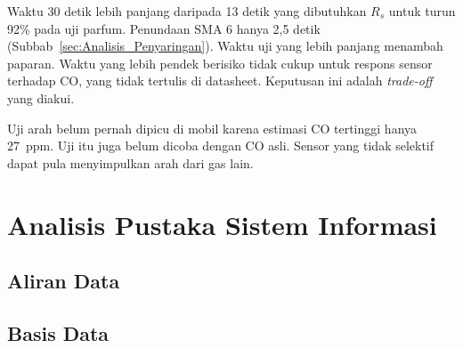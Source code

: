     Waktu 30 detik lebih panjang daripada 13 detik yang dibutuhkan $R_s$ untuk turun 92\% pada uji parfum. Penundaan SMA 6 hanya 2,5 detik (Subbab~\ref{sec:Analisis_Penyaringan}). Waktu uji yang lebih panjang menambah paparan. Waktu yang lebih pendek berisiko tidak cukup untuk respons sensor terhadap CO, yang tidak tertulis di datasheet. Keputusan ini adalah \textit{trade-off} yang diakui.

    Uji arah belum pernah dipicu di mobil karena estimasi CO tertinggi hanya 27~ppm. Uji itu juga belum dicoba dengan CO asli. Sensor yang tidak selektif dapat pula menyimpulkan arah dari gas lain.


\section{Analisis Pustaka Sistem Informasi}
\label{sec:Analisis_Sistem_Informasi}

    \subsection{Aliran Data}
    \label{sec:Aliran_Data}

    \lipsum[1]

    \subsection{Basis Data}
    \label{sec:Basis_Data}

    \lipsum[1]

